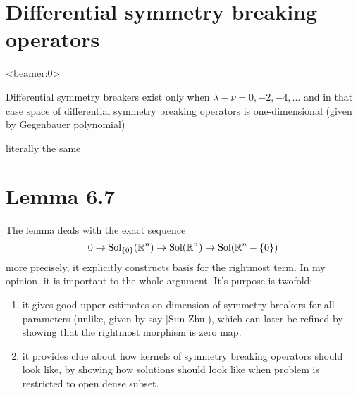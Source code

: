 \documentclass[8pt,pdf,notes]{beamer}
\newcommand{\Sol}{\mbox{Sol}}
\theoremstyle{mystyle}
\begin{document}
\section{Differential symmetry breaking operators}
\begin{frame}<beamer:0>
\begin{theorem}
	Differential symmetry breakers exist only when $\lambda-\nu=0,-2,-4,\hdots$ and in that case space of
	differential symmetry breaking operators is one-dimensional (given by Gegenbauer polynomial)
\end{theorem}
\begin{theorem}[$O(p,q),\;n:=(p-1)+(q-1)$]
	literally the same
\end{theorem}
\end{frame}
\section{Lemma 6.7}
\begin{frame}
	The lemma deals with the exact sequence
	\[0\rightarrow \Sol_{\mycbra{0}}(\R^n)\rightarrow \Sol(\R^n)\rightarrow\Sol(\R^n-\mycbra{0})\]
	more precisely, it explicitly constructs basis for the rightmost term.
In my opinion, it is important to the whole argument. It's purpose is twofold:
\begin{enumerate}
	\item it gives good upper estimates on dimension of symmetry breakers for all parameters (unlike, given by say [Sun-Zhu]),
		which can later be refined by showing that the rightmost morphism is zero map.
	\item it provides clue about how kernels of symmetry breaking operators should look like, by showing how solutions should
		look like when problem is restricted to open dense subset.
\end{enumerate}
\end{frame}
\end{document}
